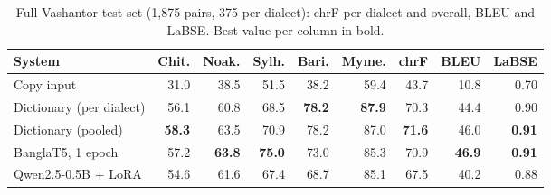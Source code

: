 \begin{table}[t]\centering\small
\begin{tabular}{@{}lrrrrrrrr@{}}\toprule
System & Chit. & Noak. & Sylh. & Bari. & Myme. & chrF & BLEU & LaBSE\\\midrule
Copy input & 31.0 & 38.5 & 51.5 & 38.2 & 59.4 & 43.7 & 10.8 & 0.70\\
\addlinespace[1pt]
Dictionary (per dialect) & 56.1 & 60.8 & 68.5 & \textbf{78.2} & \textbf{87.9} & 70.3 & 44.4 & 0.90\\
Dictionary (pooled) & \textbf{58.3} & 63.5 & 70.9 & 78.2 & 87.0 & \textbf{71.6} & 46.0 & \textbf{0.91}\\
BanglaT5, 1 epoch & 57.2 & \textbf{63.8} & \textbf{75.0} & 73.0 & 85.3 & 70.9 & \textbf{46.9} & \textbf{0.91}\\
Qwen2.5-0.5B + LoRA & 54.6 & 61.6 & 67.4 & 68.7 & 85.1 & 67.5 & 40.2 & 0.88\\
\bottomrule\end{tabular}
\caption{Full Vashantor test set (1,875 pairs, 375 per dialect): chrF per dialect and overall, BLEU and LaBSE. Best value per column in bold.}\label{tab:main}
\end{table}

